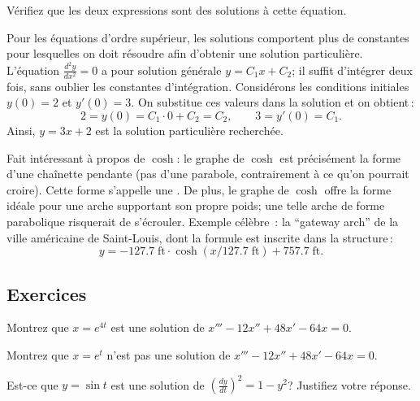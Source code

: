 \begin{exercise}
V\'erifiez que les deux expressions sont des solutions \`a cette \'equation.
\end{exercise}

\begin{example}
Pour les \'equations d'ordre sup\'erieur, les solutions comportent plus de constantes pour lesquelles on doit r\'esoudre afin d'obtenir une solution particuli\`ere.  L'\'equation  $\frac{d^2y}{dx^2} = 0$ a pour solution g\'en\'erale $y = C_1 x + C_2$; il suffit d'int\'egrer deux fois, sans oublier les constantes d'int\'egration.  Consid\'erons les conditions initiales $y(0) =
2$ et $y'(0) = 3$.  On substitue ces valeurs dans la solution et on obtient\,: 
\begin{equation*}
2 = y(0) = C_1 \cdot 0 + C_2 = C_2, \qquad
3 = y'(0) = C_1 .
\end{equation*}
Ainsi, $y = 3x + 2$ est la solution particuli\`ere recherch\'ee.
\end{example}

Fait int\'eressant \`a propos de $\cosh$:  le graphe de $\cosh$ est pr\'ecis\'ement la forme d'une cha\^inette pendante (pas d'une parabole, contrairement \`a ce qu'on pourrait croire).  Cette forme s'appelle une \emph{}.
De plus, le graphe de $\cosh$ offre la forme id\'eale pour une arche supportant son propre poids; une telle arche de forme parabolique risquerait de s'écrouler.  Exemple c\'el\`ebre \,:  la  ``gateway arch'' de la ville 
am\'ericaine de Saint-Louis, dont la formule est inscrite dans la structure\,:
\begin{equation*}
y = -127.7 \; \textrm{ft} \cdot \cosh({x / 127.7  \; \textrm{ft}}) + 757.7 \;
\textrm{ft} .
\end{equation*}


\subsection{Exercices}

\begin{exercise}
Montrez que $x = e^{4t}$ est une solution de $x'''-12 x'' + 48 x' - 64 x = 0$.
\end{exercise}

\begin{exercise}
Montrez que $x = e^{t}$ n'est pas une solution de $x'''-12 x'' + 48 x' - 64 x = 0$.
\end{exercise}

\begin{exercise}
Est-ce que $y = \sin t$ est une solution de ${\left( \frac{dy}{dt} \right)}^2 = 1 - y^2$?
Justifiez votre r\'eponse.
\end{exercise}

